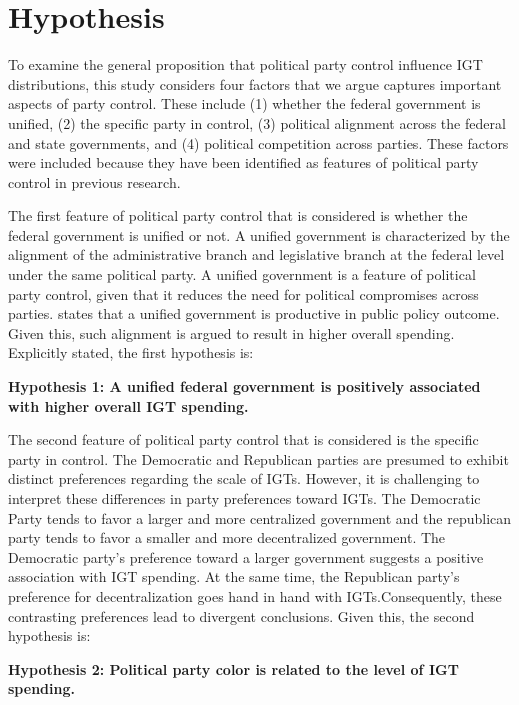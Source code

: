 \section{Hypothesis}

To examine the general proposition that political party control influence IGT distributions, this study considers four factors that we argue captures important aspects of party control. These include (1) whether the federal government is unified, (2) the specific party in control, (3) political alignment across the federal and state governments, and (4) political competition across parties. These factors were included because they have been identified as features of political party control in previous research.

The first feature of political party control that is considered is whether the federal government is unified or not. A unified government is characterized by the alignment of the administrative branch and legislative branch at the federal level under the same political party. A unified government is a feature of political party control, given that  it reduces the need for political compromises across parties. \textcite{coleman1999unified} states that a unified government is productive in public policy outcome. Given this, such alignment is argued to result in higher overall spending. Explicitly stated, the first hypothesis is:

\textbf{Hypothesis 1: A unified federal government is positively associated with higher overall IGT spending.}

The second feature of political party control that is considered is the specific party in control. The Democratic and Republican parties are presumed to exhibit distinct preferences regarding the scale of IGTs\parencite{weaver2010paths,winters1976party}. However, it is challenging
to interpret these differences in party preferences toward IGTs. The Democratic Party tends to favor a larger and more centralized government and the republican party tends to favor a smaller and more decentralized government. The Democratic party's preference toward a larger government suggests a positive association with IGT spending. At the same time, the Republican party's preference for decentralization goes hand in hand with IGTs.Consequently, these contrasting preferences lead to divergent conclusions. Given this, the second hypothesis is:

\textbf{Hypothesis 2: Political party color is related to the level of IGT spending.}

